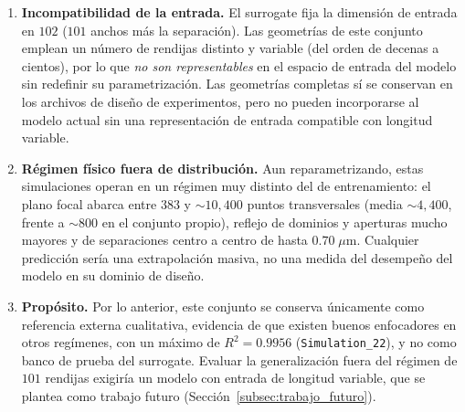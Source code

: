 \begin{enumerate}
    \item \textbf{Incompatibilidad de la entrada.} El surrogate fija la dimensión de entrada en $102$ ($101$ anchos más la separación). Las geometrías de este conjunto emplean un número de rendijas distinto y variable (del orden de decenas a cientos), por lo que
    \emph{no son representables} en el espacio de entrada del modelo sin redefinir su parametrización. Las geometrías completas sí se conservan en los archivos de diseño de experimentos, pero no pueden incorporarse al modelo actual sin una representación de entrada compatible con longitud variable.
    \item \textbf{Régimen físico fuera de distribución.} Aun reparametrizando, estas simulaciones operan en un régimen muy distinto del de entrenamiento: el plano focal abarca entre $383$ y ${\sim}10{,}400$ puntos transversales (media ${\sim}4{,}400$, frente a ${\sim}800$ en el conjunto propio), reflejo de dominios y aperturas mucho mayores y de separaciones centro a centro de hasta $0.70\;\mu$m. Cualquier predicción sería una extrapolación masiva, no una medida del desempeño del modelo en su dominio de diseño.
    \item \textbf{Propósito.} Por lo anterior, este conjunto se conserva únicamente como referencia externa cualitativa, evidencia de que existen buenos enfocadores en otros regímenes, con un máximo de $R^2 = 0.9956$ (\texttt{Simulation\_22}), y no como banco de prueba del surrogate. Evaluar la generalización fuera del régimen de $101$ rendijas exigiría un modelo con entrada de longitud variable, que se plantea como trabajo
    futuro (Sección~\ref{subsec:trabajo_futuro}).
\end{enumerate}
